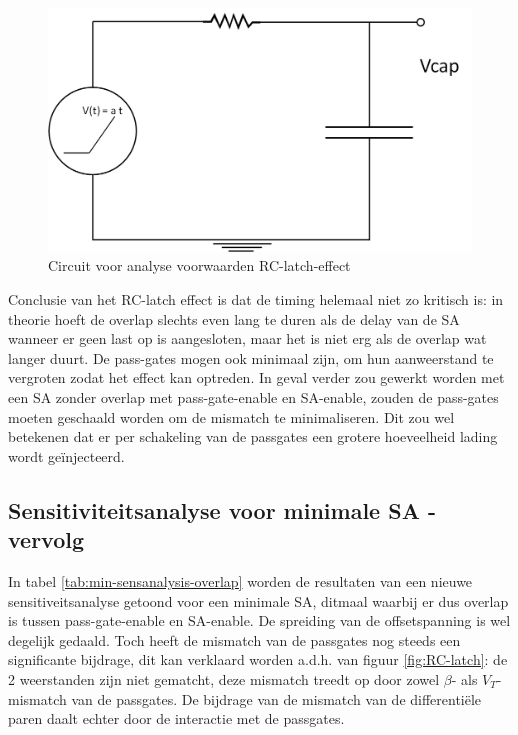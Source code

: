 \begin{figure}
  \centering
  \includegraphics[scale=0.4]{../fig/hfdstk-sensamp-RC-latch-maplecircuit.png}
  \caption{Circuit voor analyse voorwaarden RC-latch-effect}
  \label{fig:RC-latch-maplecircuit}
\end{figure}

Conclusie van het RC-latch effect is dat de timing helemaal niet zo kritisch is: in theorie hoeft de overlap slechts even lang te duren als de delay van de SA wanneer er geen last op is aangesloten, maar het is niet erg als de overlap wat langer duurt.
De pass-gates mogen ook minimaal zijn, om hun aanweerstand te vergroten zodat het effect kan optreden.
In geval verder zou gewerkt worden met een SA zonder overlap met pass-gate-enable en SA-enable, zouden de pass-gates moeten geschaald worden om de mismatch te minimaliseren. Dit zou wel betekenen dat er per schakeling van de passgates een grotere hoeveelheid lading wordt geïnjecteerd.


\subsection{Sensitiviteitsanalyse voor minimale SA - vervolg}

In tabel \ref{tab:min-sensanalysis-overlap} worden de resultaten van een nieuwe sensitiveitsanalyse getoond voor een minimale SA, ditmaal waarbij er dus overlap is tussen pass-gate-enable en SA-enable. De spreiding van de offsetspanning is wel degelijk gedaald. Toch heeft de mismatch van de passgates nog steeds een significante bijdrage, dit kan verklaard worden a.d.h. van figuur \ref{fig:RC-latch}: de 2 weerstanden zijn niet gematcht, deze mismatch treedt op door zowel $\beta$- als $V_{T}$-mismatch van de passgates. De bijdrage van de mismatch van de differentiële paren daalt echter door de interactie met de passgates.


